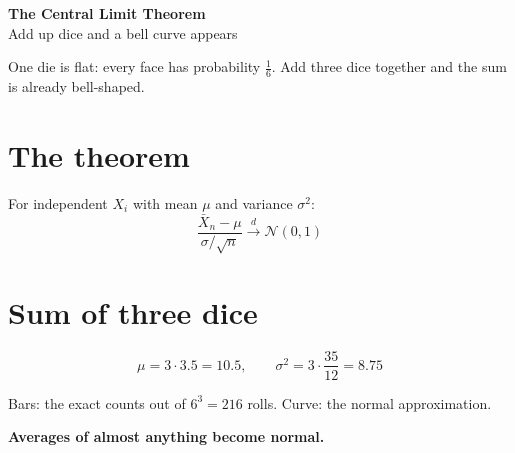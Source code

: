 \documentclass[11pt]{article}
\begin{document}
\begin{center}
  {\LARGE\bfseries The Central Limit Theorem}\\[4pt]
  {\large Add up dice and a bell curve appears}
\end{center}

One die is flat: every face has probability \(\tfrac16\).
Add three dice together and the sum is already bell-shaped.

\section*{The theorem}
For independent \(X_i\) with mean \(\mu\) and variance \(\sigma^2\):
\[
  \frac{\bar X_n - \mu}{\sigma / \sqrt{n}}
  \xrightarrow{\;d\;} \mathcal{N}(0, 1)
\]

\section*{Sum of three dice}
\[
  \mu = 3 \cdot 3.5 = 10.5, \qquad \sigma^2 = 3 \cdot \frac{35}{12} = 8.75
\]

\begin{center}
\end{center}

Bars: the exact counts out of \(6^3 = 216\) rolls.
Curve: the normal approximation.

\centerline{\bfseries Averages of almost anything become normal.}
\end{document}

